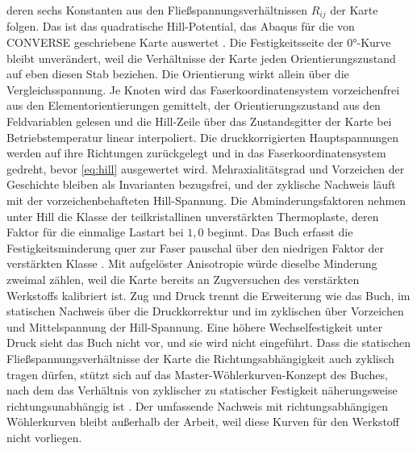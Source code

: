 deren sechs Konstanten aus den Fließspannungsverhältnissen $R_{ij}$ der Karte folgen. Das ist das quadratische Hill-Potential, das Abaqus für die von CONVERSE geschriebene Karte auswertet \cite{AbaqusHill25}. Die Festigkeitsseite der $0$°-Kurve bleibt unverändert, weil die Verhältnisse der Karte jeden Orientierungszustand auf eben diesen Stab beziehen. Die Orientierung wirkt allein über die Vergleichsspannung. Je Knoten wird das Faserkoordinatensystem vorzeichenfrei aus den Elementorientierungen gemittelt, der Orientierungszustand aus den Feldvariablen gelesen und die Hill-Zeile über das Zustandsgitter der Karte bei Betriebstemperatur linear interpoliert. Die druckkorrigierten Hauptspannungen werden auf ihre Richtungen zurückgelegt und in das Faserkoordinatensystem gedreht, bevor \eqref{eq:hill} ausgewertet wird. Mehraxialitätsgrad und Vorzeichen der Geschichte bleiben als Invarianten bezugsfrei, und der zyklische Nachweis läuft mit der vorzeichenbehafteten Hill-Spannung. Die Abminderungsfaktoren nehmen unter Hill die Klasse der teilkristallinen unverstärkten Thermoplaste, deren Faktor für die einmalige Lastart bei $1{,}0$ beginnt. Das Buch erfasst die Festigkeitsminderung quer zur Faser pauschal über den niedrigen Faktor der verstärkten Klasse \cite[S.~345 bis 346]{Sto18}. Mit aufgelöster Anisotropie würde dieselbe Minderung zweimal zählen, weil die Karte bereits an Zugversuchen des verstärkten Werkstoffs kalibriert ist. Zug und Druck trennt die Erweiterung wie das Buch, im statischen Nachweis über die Druckkorrektur und im zyklischen über Vorzeichen und Mittelspannung der Hill-Spannung. Eine höhere Wechselfestigkeit unter Druck sieht das Buch nicht vor, und sie wird nicht eingeführt. Dass die statischen Fließspannungsverhältnisse der Karte die Richtungsabhängigkeit auch zyklisch tragen dürfen, stützt sich auf das Master-Wöhlerkurven-Konzept des Buches, nach dem das Verhältnis von zyklischer zu statischer Festigkeit näherungsweise richtungsunabhängig ist \cite[S.~236 bis 237]{Sto18}. Der umfassende Nachweis mit richtungsabhängigen Wöhlerkurven bleibt außerhalb der Arbeit, weil diese Kurven für den Werkstoff nicht vorliegen.


